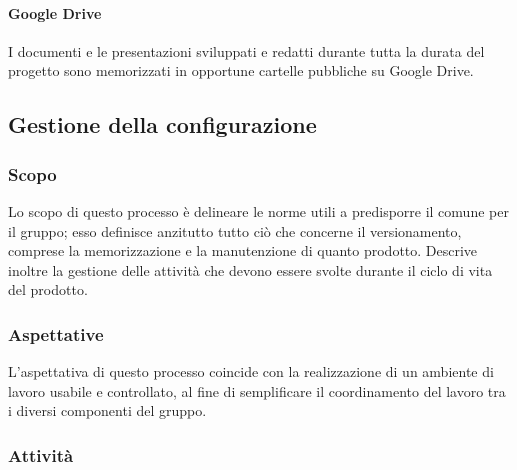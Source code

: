 \documentclass[../norme-di-progetto.tex]{subfiles}
\begin{document}
\paragraph{Google Drive}
I documenti e le presentazioni sviluppati e redatti durante tutta la durata del progetto sono memorizzati in opportune cartelle pubbliche su Google Drive.


\subsection{Gestione della configurazione}
\subsubsection{Scopo}
Lo scopo di questo processo è delineare le norme utili a predisporre il  comune per il gruppo; esso definisce anzitutto tutto ciò che concerne il versionamento, comprese la memorizzazione e la manutenzione di quanto prodotto. Descrive inoltre la gestione delle attività che devono essere svolte durante il ciclo di vita del prodotto.

\subsubsection{Aspettative}
L'aspettativa di questo processo coincide con la realizzazione di un ambiente di lavoro usabile e controllato, al fine di semplificare il coordinamento del lavoro tra i diversi componenti del gruppo.

\subsubsection{Attività}
\end{document}
